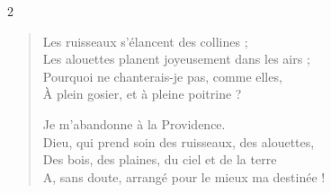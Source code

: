 \documentclass[a4paper,11pt]{article}
\begin{document}
\begin{paracol}{2}
{\begin{verse}
Les ruisseaux s’élancent des collines ;\\
Les alouettes planent joyeusement dans les airs ;\\
Pourquoi ne chanterais-je pas, comme elles,\\
À plein gosier, et à pleine poitrine ?

Je m’abandonne à la Providence.\\
Dieu, qui prend soin des ruisseaux, des alouettes,\\
Des bois, des plaines, du ciel et de la terre\\
A, sans doute, arrangé pour le mieux ma destinée !
\end{verse}}


\end{paracol}
\end{document}
